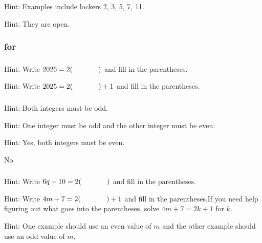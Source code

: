\subsubsection*{ \answers}
\begin{apart}
    \item Hint: Examples include lockers 2, 3, 5, 7, 11.
    \item Hint: They are open.
\end{apart}

\subsubsection{\answers for  \subevenodd}

\subsubsection*{ \answers}
\begin{apart}
    \item Hint: Write $2026 = 2(\hspace{0.5in})$ and fill in the parentheses.
    \item Hint: Write $2025 = 2(\hspace{0.5in})+1$ and fill in the parentheses.
\end{apart}

\subsubsection*{ \answers}
\begin{apart}
    \item Hint: Both integers must be odd.
    \item Hint: One integer must be odd and the other integer must be even.
    \item Hint: Yes, both integers must be even.
    \item No
\end{apart}

\subsubsection*{ \answers}
\begin{apart}
    \item Hint: Write $6q-10=2(\hspace{0.5in})$ and fill in the parentheses.
    \item Hint: Write $4m+7=2(\hspace{0.5in})+1$ and fill in the parentheses.If you need help figuring out what goes into the parentheses, solve $4m+7=2k+1$ for $k$.  
    \item Hint:  One example should use an even value of $m$ and the other example should use an odd value of $m$.
\end{apart}

